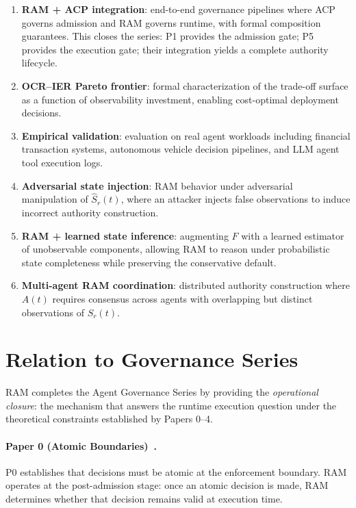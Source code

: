 \documentclass[11pt]{article}
\newcommand{\Sr}{S_r}
\begin{document}
\begin{enumerate}[leftmargin=*, label=(\roman*)]
  \item \textbf{RAM + ACP integration}: end-to-end governance pipelines where
        ACP governs admission and RAM governs runtime, with formal composition
        guarantees.
        This closes the series: P1 provides the admission gate; P5 provides the
        execution gate; their integration yields a complete authority lifecycle.
  \item \textbf{OCR--IER Pareto frontier}: formal characterization of the
        trade-off surface as a function of observability investment, enabling
        cost-optimal deployment decisions.
  \item \textbf{Empirical validation}: evaluation on real agent workloads
        including financial transaction systems, autonomous vehicle decision
        pipelines, and LLM agent tool execution logs.
  \item \textbf{Adversarial state injection}: RAM behavior under adversarial
        manipulation of $\hat{S}_r(t)$, where an attacker injects false
        observations to induce incorrect authority construction.
  \item \textbf{RAM + learned state inference}: augmenting $F$ with a learned
        estimator of unobservable components, allowing RAM to reason under
        probabilistic state completeness while preserving the conservative
        default.
  \item \textbf{Multi-agent RAM coordination}: distributed authority
        construction where $A(t)$ requires consensus across agents with
        overlapping but distinct observations of $\Sr(t)$.
\end{enumerate}

\section{Relation to Governance Series}
\label{sec:series}

RAM completes the Agent Governance Series by providing the \emph{operational
closure}: the mechanism that answers the runtime execution question under the
theoretical constraints established by Papers 0--4.

\paragraph{Paper 0 (Atomic Boundaries)~\cite{fernandez2026a}.}
P0 establishes that decisions must be atomic at the enforcement boundary.
RAM operates at the post-admission stage: once an atomic decision is made,
RAM determines whether that decision remains valid at execution time.
\end{document}
